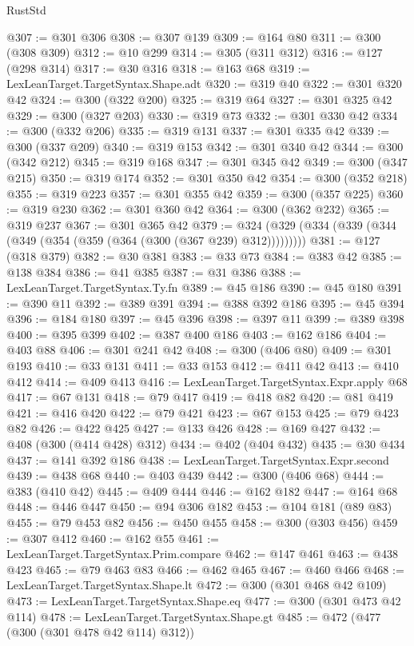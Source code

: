 \begin{lexlean}{RustStd}
\begin{coremodule}
{\begin{coremodule}
{{{{{{{{{{{{{{{{{{{{{{{{{{{{{{{@307 := @301 @306
@308 := @307 @139
@309 := @164 @80
@311 := @300 (@308 @309)
@312 := @10 @299
@314 := @305 (@311 @312)
@316 := @127 (@298 @314)
@317 := @30 @316
@318 := @163 @68
@319 := LexLeanTarget.TargetSyntax.Shape.adt
@320 := @319 @40
@322 := @301 @320 @42
@324 := @300 (@322 @200)
@325 := @319 @64
@327 := @301 @325 @42
@329 := @300 (@327 @203)
@330 := @319 @73
@332 := @301 @330 @42
@334 := @300 (@332 @206)
@335 := @319 @131
@337 := @301 @335 @42
@339 := @300 (@337 @209)
@340 := @319 @153
@342 := @301 @340 @42
@344 := @300 (@342 @212)
@345 := @319 @168
@347 := @301 @345 @42
@349 := @300 (@347 @215)
@350 := @319 @174
@352 := @301 @350 @42
@354 := @300 (@352 @218)
@355 := @319 @223
@357 := @301 @355 @42
@359 := @300 (@357 @225)
@360 := @319 @230
@362 := @301 @360 @42
@364 := @300 (@362 @232)
@365 := @319 @237
@367 := @301 @365 @42
@379 := @324 (@329 (@334 (@339 (@344 (@349 (@354 (@359 (@364 (@300 (@367 @239) @312)))))))))
@381 := @127 (@318 @379)
@382 := @30 @381
@383 := @33 @73
@384 := @383 @42
@385 := @138 @384
@386 := @41 @385
@387 := @31 @386
@388 := LexLeanTarget.TargetSyntax.Ty.fn
@389 := @45 @186
@390 := @45 @180
@391 := @390 @11
@392 := @389 @391
@394 := @388 @392 @186
@395 := @45 @394
@396 := @184 @180
@397 := @45 @396
@398 := @397 @11
@399 := @389 @398
@400 := @395 @399
@402 := @387 @400 @186
@403 := @162 @186
@404 := @403 @88
@406 := @301 @241 @42
@408 := @300 (@406 @80)
@409 := @301 @193
@410 := @33 @131
@411 := @33 @153
@412 := @411 @42
@413 := @410 @412
@414 := @409 @413
@416 := LexLeanTarget.TargetSyntax.Expr.apply @68
@417 := @67 @131
@418 := @79 @417
@419 := @418 @82
@420 := @81 @419
@421 := @416 @420
@422 := @79 @421
@423 := @67 @153
@425 := @79 @423 @82
@426 := @422 @425
@427 := @133 @426
@428 := @169 @427
@432 := @408 (@300 (@414 @428) @312)
@434 := @402 (@404 @432)
@435 := @30 @434
@437 := @141 @392 @186
@438 := LexLeanTarget.TargetSyntax.Expr.second
@439 := @438 @68
@440 := @403 @439
@442 := @300 (@406 @68)
@444 := @383 (@410 @42)
@445 := @409 @444
@446 := @162 @182
@447 := @164 @68
@448 := @446 @447
@450 := @94 @306 @182
@453 := @104 @181 (@89 @83)
@455 := @79 @453 @82
@456 := @450 @455
@458 := @300 (@303 @456)
@459 := @307 @412
@460 := @162 @55
@461 := LexLeanTarget.TargetSyntax.Prim.compare
@462 := @147 @461
@463 := @438 @423
@465 := @79 @463 @83
@466 := @462 @465
@467 := @460 @466
@468 := LexLeanTarget.TargetSyntax.Shape.lt
@472 := @300 (@301 @468 @42 @109)
@473 := LexLeanTarget.TargetSyntax.Shape.eq
@477 := @300 (@301 @473 @42 @114)
@478 := LexLeanTarget.TargetSyntax.Shape.gt
@485 := @472 (@477 (@300 (@301 @478 @42 @114) @312))
}}}}}}}}}}}}}}}}}}}}}}}}}}}}}}}
\end{coremodule}}
\end{coremodule}
\end{lexlean}
